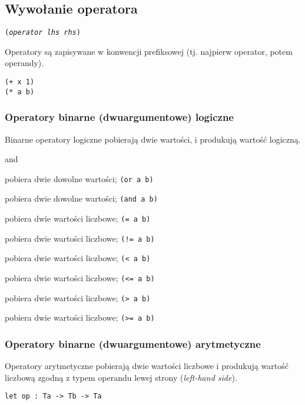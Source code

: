 \subsection{Wywołanie operatora}

\texttt{(\emph{operator} \emph{lhs} \emph{rhs})}
\vspace{1em}

Operatory są zapisywane w konwencji prefiksowej (tj. najpierw operator, potem operandy).

\begin{lstlisting}
(+ x 1)
(* a b)
\end{lstlisting}

\subsubsection{Operatory binarne (dwuargumentowe) logiczne}

Binarne operatory logiczne pobierają dwie wartości, i produkują wartość logiczną.

\begin{labeling}{and}
    \item[\texttt{or}] pobiera dwie dowolne wartości; \texttt{(or a b)}
    \item[\texttt{and}] pobiera dwie dowolne wartości; \texttt{(and a b)}
    \item[\texttt{=}] pobiera dwie wartości liczbowe; \texttt{(= a b)}
    \item[\texttt{!=}] pobiera dwie wartości liczbowe; \texttt{(!= a b)}
    \item[\texttt{<}] pobiera dwie wartości liczbowe; \texttt{(< a b)}
    \item[\texttt{<=}] pobiera dwie wartości liczbowe; \texttt{(<= a b)}
    \item[\texttt{>}] pobiera dwie wartości liczbowe; \texttt{(> a b)}
    \item[\texttt{>=}] pobiera dwie wartości liczbowe; \texttt{(>= a b)}
\end{labeling}

\subsubsection{Operatory binarne (dwuargumentowe) arytmetyczne}

Operatory arytmetyczne pobierają dwie wartości liczbowe i produkują wartość liczbową zgodną z typem operandu
lewej strony (\emph{left-hand side}).

\begin{lstlisting}
let op : Ta -> Tb -> Ta
\end{lstlisting}

